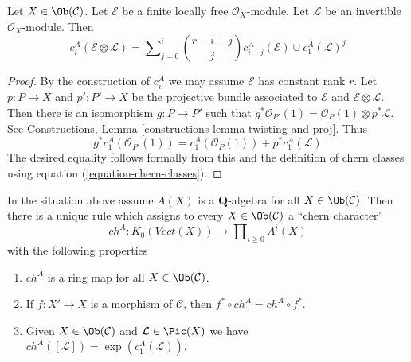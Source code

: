 \begin{lemma}
\label{lemma-chern-classes-E-tensor-L}
Let $X \in \Ob(\mathcal{C})$. Let $\mathcal{E}$ be a finite locally free
$\mathcal{O}_X$-module. Let $\mathcal{L}$ be an invertible
$\mathcal{O}_X$-module. Then
$$
c^A_i({\mathcal E} \otimes {\mathcal L})
=
\sum\nolimits_{j = 0}^i
\binom{r - i + j}{j} c^A_{i - j}({\mathcal E}) \cup c^A_1({\mathcal L})^j
$$
\end{lemma}

\begin{proof}
By the construction of $c^A_i$ we may assume $\mathcal{E}$ has
constant rank $r$. Let $p : P \to X$ and $p' : P' \to X$ be the
projective bundle associated to $\mathcal{E}$ and
$\mathcal{E} \otimes \mathcal{L}$.
Then there is an isomorphism $g : P \to P'$ such that
$g^*\mathcal{O}_{P'}(1) = \mathcal{O}_P(1) \otimes p^*\mathcal{L}$.
See Constructions, Lemma \ref{constructions-lemma-twisting-and-proj}.
Thus
$$
g^*c_1^A(\mathcal{O}_{P'}(1)) =
c_1^A(\mathcal{O}_P(1)) + p^*c_1^A(\mathcal{L})
$$
The desired equality follows formally from this and the definition
of chern classes using equation (\ref{equation-chern-classes}).
\end{proof}

\begin{proposition}
\label{proposition-chern-character}
In the situation above assume $A(X)$ is a $\mathbf{Q}$-algebra for all
$X \in \Ob(\mathcal{C})$. Then there is a unique rule which assigns to
every $X \in \Ob(\mathcal{C})$ a ``chern character''
$$
ch^A : K_0(\textit{Vect}(X)) \longrightarrow
\prod\nolimits_{i \geq 0} A^i(X)
$$
with the following properties
\begin{enumerate}
\item $ch^A$ is a ring map for all $X \in \Ob(\mathcal{C})$.
\item If $f : X' \to X$ is a morphism of $\mathcal{C}$, then
$f^* \circ ch^A =  ch^A \circ f^*$.
\item Given $X \in \Ob(\mathcal{C})$ and $\mathcal{L} \in \Pic(X)$
we have $ch^A([\mathcal{L}]) = \exp(c_1^A(\mathcal{L}))$.
\end{enumerate}
\end{proposition}

